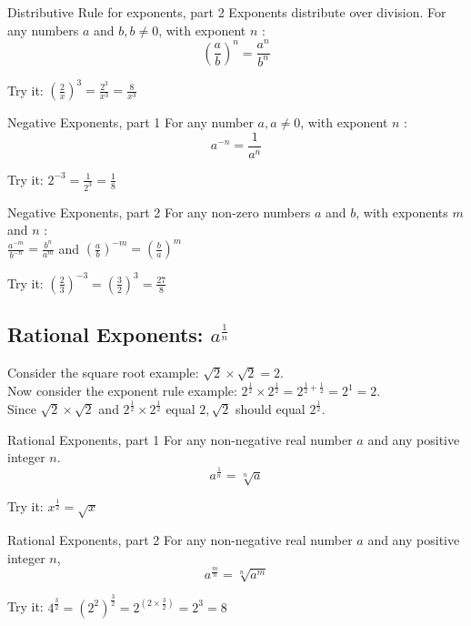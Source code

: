 \documentclass[12pt,fleqn]{book}
\begin{document}
\begin{thm}{Distributive Rule for exponents, part 2}{}
    Exponents distribute over division.
For any numbers $a$ and $b, b \neq 0$, with exponent $n$ :
\[
\left(\frac{a}{b}\right)^{n}=\frac{a^{n}}{b^{n}}
\]
\end{thm}
Try it: 
$\left(\frac{2}{x}\right)^{3}=\frac{2^{3}}{x^{3}}=\frac{8}{x^{3}}$

\begin{thm}{Negative Exponents, part 1}{}
For any number $a, a \neq 0$, with exponent $n$ :
\[
a^{-n}=\frac{1}{a^{n}}
\]
\end{thm}
Try it: $2^{-3}=\frac{1}{2^{3}}=\frac{1}{8}$
\\[2in]
\begin{thm}{Negative Exponents, part 2}
For any non-zero numbers $a$ and $b$, with exponents $m$ and $n$ :\\
$\frac{a^{-m}}{b^{-n}}=\frac{b^{n}}{a^{m}}$ and $\left(\frac{a}{b}\right)^{-m}=\left(\frac{b}{a}\right)^{m}$
\end{thm}
Try it:
$\left(\frac{2}{3}\right)^{-3}=\left(\frac{3}{2}\right)^{3}=\frac{27}{8}$
\\[2in]
\subsection*{Rational Exponents: $a^{\frac{1}{n}}$}
Consider the square root example: $\sqrt{2} \times \sqrt{2}=2$.\\
Now consider the exponent rule example: $2^{\frac{1}{2}} \times 2^{\frac{1}{2}}=2^{\frac{1}{2}+\frac{1}{2}}=2^{1}=2$.\\

Since $\sqrt{2} \times \sqrt{2}$ and $2^{\frac{1}{2}} \times 2^{\frac{1}{2}}$ equal $2, \sqrt{2}$ should equal $2^{\frac{1}{2}}$.

\begin{thm}{Rational Exponents, part 1}{}
For any non-negative real number $a$ and any positive integer $n$.
\[
a^{\frac{1}{n}}=\sqrt[n]{a}
\]
\end{thm}
Try it: $x^{\frac{1}{2}}=\sqrt{x}$

\begin{thm}{Rational Exponents, part 2}{}
    For any non-negative real number $a$ and any positive integer $n$,
    \[
a^{\frac{m}{n}}=\sqrt[n]{a^{m}}
\]
\end{thm}
Try it: $4^{\frac{3}{2}}=\left(2^{2}\right)^{\frac{3}{2}}=2^{\left(2 \times \frac{3}{2}\right)}=2^{3}=8$
\end{document}
